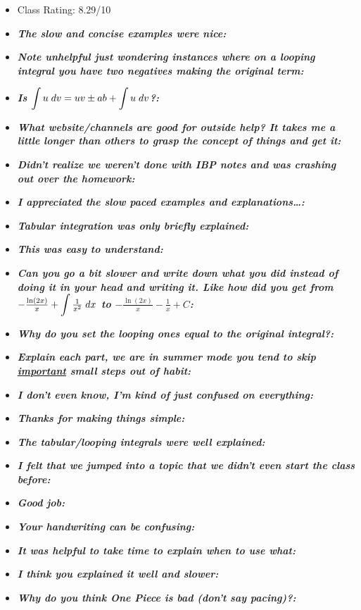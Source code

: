 \documentclass[11pt,letterpaper]{article}
\begin{document}
\begin{itemize}
\item Class Rating: 8.29/10
\item {\bfseries\itshape The slow and concise examples were nice:}
\item {\bfseries\itshape Note unhelpful just wondering instances where on a looping integral you have two negatives making the original term:} 
\item {\bfseries\itshape Is $\displaystyle \int u \;dv= uv \pm ab + \int u \;dv$?:}
\item {\bfseries\itshape What website/channels are good for outside help? It takes me a little longer than others to grasp the concept of things and get it:} 
\item {\bfseries\itshape Didn't realize we weren't done with IBP notes and was crashing out over the homework:} 
\item {\bfseries\itshape I appreciated the slow paced examples and explanations\dots:} 
\item {\bfseries\itshape Tabular integration was only briefly explained:} 
\item {\bfseries\itshape This was easy to understand:}
\item {\bfseries\itshape Can you go a bit slower and write down what you did instead of doing it in your head and writing it. Like how did you get from $\displaystyle -\tfrac{\ln(2x)}{x} + \int \tfrac{1}{x^2} \;dx$ to $-\tfrac{\ln(2x)}{x} - \tfrac{1}{x} + C$:} 
\item {\bfseries\itshape Why do you set the looping ones equal to the original integral?:} 
\item {\bfseries\itshape Explain each part, we are in summer mode you tend to skip \underline{important} small steps out of habit:} 
\item {\bfseries\itshape I don't even know, I'm kind of just confused on everything:} 
\item {\bfseries\itshape Thanks for making things simple:}
\item {\bfseries\itshape The tabular/looping integrals were well explained:}
\item {\bfseries\itshape I felt that we jumped into a topic that we didn't even start the class before:}
\item {\bfseries\itshape Good job:} 
\item {\bfseries\itshape Your handwriting can be confusing:}
\item {\bfseries\itshape It was helpful to take time to explain when to use what:} 
\item {\bfseries\itshape I think you explained it well and slower:} 
\item {\bfseries\itshape Why do you think One Piece is bad (don't say pacing)?:}
\end{itemize}
\end{document}
